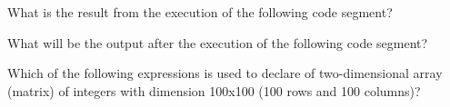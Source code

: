 \documentclass[11pt]{examdesign}
\begin{document}
\begin{multiplechoice}[title={},suppressprefix=yes,rearrange=yes]
\begin{question}
What is the result from the execution of the following code segment?
\end{question}

\begin{question}
What will be the output after the execution of the following code segment?
  \end{question}
  
\begin{question}
Which of the following expressions is used to declare of two-dimensional
array (matrix) of integers with dimension 100x100 (100 rows and 100 columns)?
\end{question}

\end{multiplechoice}
\end{document}
